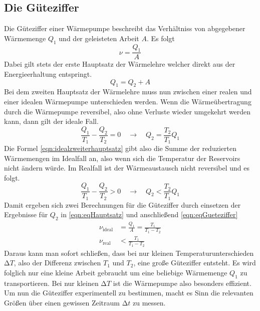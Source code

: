 \subsection{Die Güteziffer}
\label{sec:Gueteziffer}
Die Güteziffer einer Wärmepumpe beschreibt das Verhältniss von abgegebener Wärmemenge $Q_{1}$ und der geleisteten Arbeit $A$. Es folgt
\begin{equation}
\label{eqn:eqGueteziffer}
\nu = \frac{Q_{1}}{A}
\end{equation}
Dabei gilt stets der erste Hauptsatz der Wärmelehre welcher direkt aus der Energieerhaltung entspringt.
\begin{equation}
\label{eqn:eqHauptsatz}
Q_{1} = Q_{2} + A
\end{equation}
Bei dem zweiten Hauptsatz der Wärmelehre muss nun zwischen einer realen und einer idealen Wärmepumpe unterschieden werden.
Wenn die Wärmeübertragung durch die Wärmepumpe reversibel, also ohne Verluste wieder umgekehrt werden kann, dann gilt der ideale Fall.
\begin{equation}
\label{eqn:idealzweiterhauptsatz}
\frac{Q_{1}}{T_{1}} - \frac{Q_{2}}{T_{2}} = 0 \quad \to \quad Q_{2} = \frac{T_{2}}{T_{1}} Q_{1}
\end{equation}
Die Formel \eqref{eqn:idealzweiterhauptsatz} gibt also die Summe der reduzierten Wärmemengen im Idealfall an, also wenn sich die Temperatur der Reservoirs nicht ändern würde.
Im Realfall ist der Wärmeaustausch nicht reversibel und es folgt.
\begin{equation}
\label{eqn:realzweiterhauptsatz}
\frac{Q_{1}}{T_{1}} - \frac{Q_{2}}{T_{2}} > 0 \quad \to \quad Q_{2} < \frac{T_{2}}{T_{1}} Q_{1}
\end{equation}
Damit ergeben sich zwei Berechnungen für die Güteziffer durch einsetzen der Ergebnisse für $Q_{2}$ in \eqref{eqn:eqHauptsatz} und anschließend \eqref{eqn:eqGueteziffer}
\begin{align}
\nu_{\text{ideal}} &= \frac{Q_{1}}{A} = \frac{T_{1}}{T_{1}-T_{2}} \label{eqn:idealgueteziffer}\\
\nu_{\text{real}} &< \frac{T_{1}}{T_{1}-T_{2}} \label{eqn:realgueteziffer}
\end{align}
Daraus kann man sofort schließen, dass bei nur kleinen Temperaturunterschieden $\increment T$, also der Differenz zwischen $T_{1}$ und $T_{2}$, eine große Güteziffer
entsteht. Es wird folglich nur eine kleine Arbeit gebraucht um eine beliebige Wärmemenge $Q_{1}$ zu transportieren. Bei nur kleinen $\increment T$ ist die Wärmepumpe also 
besonders effizient.
Um nun die Güteziffer experimentell zu bestimmen, macht es Sinn die relevanten Größen über einen gewissen Zeitraum $\increment t$ zu messen.
